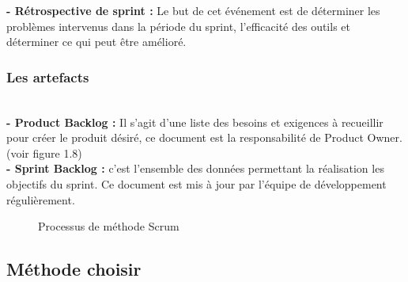 \noindent \textbf{\LARGE - Rétrospective de sprint : }\textsf{\selectfont{} Le but de cet événement est de déterminer les problèmes intervenus dans la période du sprint, l’efficacité des outils et déterminer ce qui peut être amélioré.}\\[0.1cm]

\subsubsection{ \Large Les artefacts}
\texttt{}\\[0.1cm]
\noindent \textbf{\LARGE - Product Backlog : }\textsf{
    \selectfont{} Il s’agit d’une liste des besoins et exigences à recueillir pour créer le produit désiré, ce document est la responsabilité de Product Owner.(voir figure 1.8)}\\[0.1cm]

\noindent \textbf{\LARGE - Sprint Backlog : }\textsf{\selectfont{} c’est l’ensemble des données permettant la réalisation les objectifs du sprint. Ce document est mis à jour par l’équipe de développement régulièrement.}
\texttt{}
\begin{figure}[H]
    \begin{center}
    \end{center}
    \caption{Processus de méthode Scrum}
\end{figure}

\subsection{\Large Méthode choisir }
\texttt{}\\[0.1cm]

